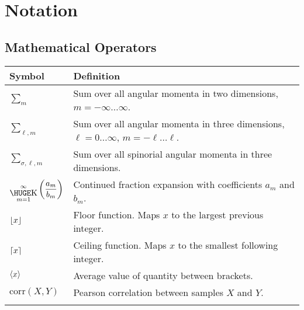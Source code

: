\chapter*{Notation}


\section*{Mathematical Operators}
\begin{tabularx}{\textwidth}{lX}
  \hline\hline
  Symbol				& Definition	\\
  \hline\hline				
  ${\sum_m}$			& Sum over all angular momenta in two dimensions, $m=-\infty\ldots\infty$.\\
  ${\sum_{\ell,m}}$		& Sum over all angular momenta in three dimensions, $\ell=0\ldots\infty$, $m=-\ell\ldots\ell$. \\
  ${\sum_{\sigma,\ell,m}}$	& Sum over all spinorial angular momenta in three dimensions.	\\
  $\displaystyle{\bigk_{m=1}^\infty\left(\frac{a_m}{b_m}\right)}$
  						& Continued fraction expansion with coefficients $a_m$ and $b_m$. \\
  $\floor*{x}$			& Floor function. Maps $x$ to the largest previous integer.	\\
  $\ceil*{x}$			& Ceiling function. Maps $x$ to the smallest following integer.	\\
  $\avg{x}$				& Average value of quantity between brackets.			\\
  $\text{corr}(X,Y)$	& Pearson correlation between samples $X$ and $Y$.	\\
  \hline\hline				\\
\end{tabularx}

